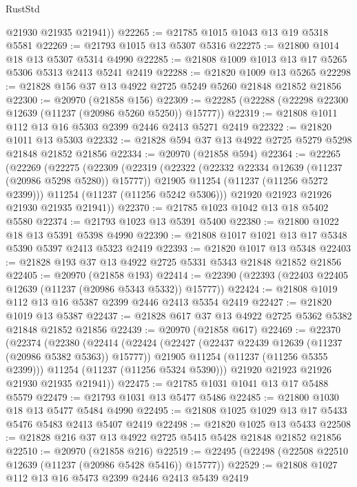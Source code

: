 \begin{lexlean}{RustStd}
\begin{coremodule}
        @21930
        @21935
        @21941))
@22265 := @21785 @1015 @1043 @13 @19 @5318 @5581
@22269 := @21793 @1015 @13 @5307 @5316
@22275 := @21800 @1014 @18 @13 @5307 @5314 @4990
@22285 := @21808 @1009 @1013 @13 @17 @5265 @5306 @5313 @2413 @5241 @2419
@22288 := @21820 @1009 @13 @5265
@22298 := @21828 @156 @37 @13 @4922 @2725 @5249 @5260 @21848 @21852 @21856
@22300 := @20970 (@21858 @156)
@22309 := @22285 (@22288 (@22298 @22300 @12639 (@11237 (@20986 @5260 @5250)) @15777))
@22319 := @21808 @1011 @112 @13 @16 @5303 @2399 @2446 @2413 @5271 @2419
@22322 := @21820 @1011 @13 @5303
@22332 := @21828 @594 @37 @13 @4922 @2725 @5279 @5298 @21848 @21852 @21856
@22334 := @20970 (@21858 @594)
@22364 := @22265
    (@22269
      (@22275
        (@22309
          (@22319
            (@22322 (@22332 @22334 @12639 (@11237 (@20986 @5298 @5280)) @15777))
            @21905
            @11254
            (@11237 (@11256 @5272 @2399)))
          @11254
          (@11237 (@11256 @5242 @5306)))
        @21920
        @21923
        @21926
        @21930
        @21935
        @21941))
@22370 := @21785 @1023 @1042 @13 @18 @5402 @5580
@22374 := @21793 @1023 @13 @5391 @5400
@22380 := @21800 @1022 @18 @13 @5391 @5398 @4990
@22390 := @21808 @1017 @1021 @13 @17 @5348 @5390 @5397 @2413 @5323 @2419
@22393 := @21820 @1017 @13 @5348
@22403 := @21828 @193 @37 @13 @4922 @2725 @5331 @5343 @21848 @21852 @21856
@22405 := @20970 (@21858 @193)
@22414 := @22390 (@22393 (@22403 @22405 @12639 (@11237 (@20986 @5343 @5332)) @15777))
@22424 := @21808 @1019 @112 @13 @16 @5387 @2399 @2446 @2413 @5354 @2419
@22427 := @21820 @1019 @13 @5387
@22437 := @21828 @617 @37 @13 @4922 @2725 @5362 @5382 @21848 @21852 @21856
@22439 := @20970 (@21858 @617)
@22469 := @22370
    (@22374
      (@22380
        (@22414
          (@22424
            (@22427 (@22437 @22439 @12639 (@11237 (@20986 @5382 @5363)) @15777))
            @21905
            @11254
            (@11237 (@11256 @5355 @2399)))
          @11254
          (@11237 (@11256 @5324 @5390)))
        @21920
        @21923
        @21926
        @21930
        @21935
        @21941))
@22475 := @21785 @1031 @1041 @13 @17 @5488 @5579
@22479 := @21793 @1031 @13 @5477 @5486
@22485 := @21800 @1030 @18 @13 @5477 @5484 @4990
@22495 := @21808 @1025 @1029 @13 @17 @5433 @5476 @5483 @2413 @5407 @2419
@22498 := @21820 @1025 @13 @5433
@22508 := @21828 @216 @37 @13 @4922 @2725 @5415 @5428 @21848 @21852 @21856
@22510 := @20970 (@21858 @216)
@22519 := @22495 (@22498 (@22508 @22510 @12639 (@11237 (@20986 @5428 @5416)) @15777))
@22529 := @21808 @1027 @112 @13 @16 @5473 @2399 @2446 @2413 @5439 @2419

\end{coremodule}
\end{lexlean}
